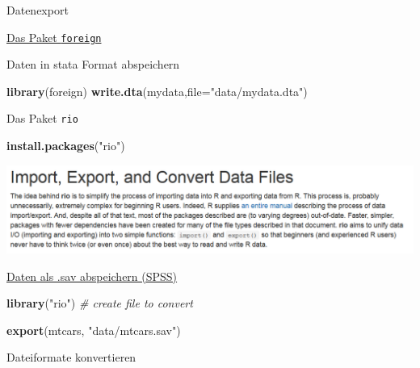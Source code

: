 \documentclass[ignorenonframetext,]{beamer}
\newenvironment{Shaded}{}{}
\newcommand{\KeywordTok}[1]{\textcolor[rgb]{0.00,0.44,0.13}{\textbf{{#1}}}}
\newcommand{\DataTypeTok}[1]{\textcolor[rgb]{0.56,0.13,0.00}{{#1}}}
\newcommand{\StringTok}[1]{\textcolor[rgb]{0.25,0.44,0.63}{{#1}}}
\newcommand{\CommentTok}[1]{\textcolor[rgb]{0.38,0.63,0.69}{\textit{{#1}}}}
\newcommand{\NormalTok}[1]{{#1}}
\begin{document}
\begin{frame}[fragile]{Datenexport}
\begin{block}{\href{https://www.r-bloggers.com/readingwriting-stata-dta-files-with-foreign/}{Das
Paket \texttt{foreign}}}
\end{block}

\begin{block}{Daten in stata Format abspeichern}

\begin{Shaded}
\begin{Highlighting}[]
\KeywordTok{library}\NormalTok{(foreign)}
\KeywordTok{write.dta}\NormalTok{(mydata,}\DataTypeTok{file=}\StringTok{"data/mydata.dta"}\NormalTok{) }
\end{Highlighting}
\end{Shaded}

\end{block}

\begin{block}{Das Paket \texttt{rio}}

\begin{Shaded}
\begin{Highlighting}[]
\KeywordTok{install.packages}\NormalTok{(}\StringTok{"rio"}\NormalTok{)}
\end{Highlighting}
\end{Shaded}

\includegraphics{./tex2pdf.9796/ac65f614039096ed31ca6b9fb206c3472a6ba9cb.png}

\end{block}

\begin{block}{\href{https://cran.r-project.org/web/packages/rio/vignettes/rio.html}{Daten
als .sav abspeichern (SPSS)}}

\begin{Shaded}
\begin{Highlighting}[]
\KeywordTok{library}\NormalTok{(}\StringTok{"rio"}\NormalTok{)}
\CommentTok{# create file to convert}

\KeywordTok{export}\NormalTok{(mtcars, }\StringTok{"data/mtcars.sav"}\NormalTok{)}
\end{Highlighting}
\end{Shaded}

\end{block}

\begin{block}{Dateiformate konvertieren}


\end{block}
\end{frame}
\end{document}
